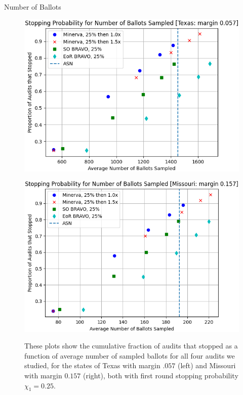 \documentclass[final]{beamer}
\newlength{\colwidth}
\begin{document}
\begin{frame}[t]
\begin{columns}[t]
\begin{column}{\colwidth}
\begin{block}{Number of Ballots}
\begin{figure}[h]
\centering
\begin{minipage}{.49\textwidth}
\includegraphics[width=1\textwidth]{texas25.png}
\label{fig:texas_25}
\end{minipage}
\begin{minipage}{.49\textwidth}
\includegraphics[width=1\textwidth]{missouri25.png}
\label{fig:missouri_25}
\end{minipage}
\caption{These plots show the cumulative fraction of audits that stopped as a function of average number of sampled ballots for all four audits we studied, for the states of Texas with margin $.057$ (left) and Missouri with margin $0.157$ (right), both with first round stopping probability $\chi_1=0.25$.}
\end{figure}


\end{block}
\end{column}
\end{columns}
\end{frame}
\end{document}
